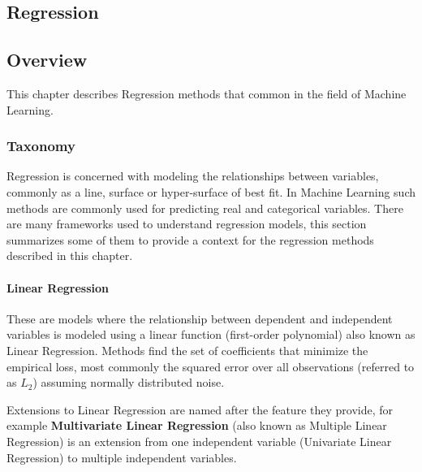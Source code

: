 

\renewcommand{\bibsection}{\subsection{\bibname}}
\begin{bibunit}

\chapter{Regression}
\label{ch:regression}

\section{Overview}
This chapter describes Regression methods that common in the field of Machine Learning.

\subsection{Taxonomy}
Regression is concerned with modeling the relationships between variables, commonly as a line, surface or hyper-surface of best fit. In Machine Learning such methods are commonly used for predicting real and categorical variables. There are many frameworks used to understand regression models, this section summarizes some of them to provide a context for the regression methods described in this chapter.

\subsubsection{Linear Regression}
These are models where the relationship between dependent and independent variables is modeled using a linear function (first-order polynomial) also known as Linear Regression. Methods find the set of coefficients that minimize the empirical loss, most commonly the squared error over all observations (referred to as $L_2$) assuming normally distributed noise.

Extensions to Linear Regression are named after the feature they provide, for example \textbf{Multivariate Linear Regression} (also known as Multiple Linear Regression) is an extension from one independent variable (Univariate Linear Regression) to multiple independent variables.


\end{bibunit}
